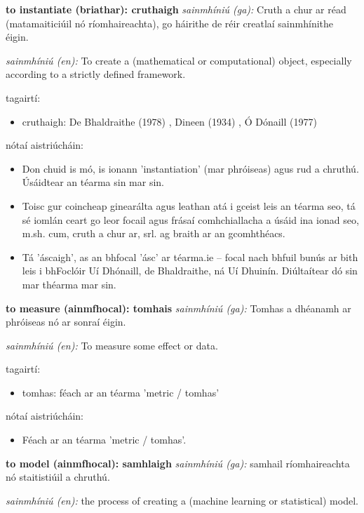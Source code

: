 \documentclass{article}
\begin{document}
\textbf{to instantiate (briathar): cruthaigh}
\textit{sainmhíniú (ga):} Cruth a chur ar réad (matamaiticiúil nó ríomhaireachta), go háirithe de réir creatlaí sainmhínithe éigin.

\textit{sainmhíniú (en):} To create a (mathematical or computational) object, especially according to a strictly defined framework.

tagairtí:
\begin{itemize}
	\item cruthaigh: De Bhaldraithe (1978) \cite{de-bhaldraithe}, Dineen (1934) \cite{dineen}, Ó Dónaill (1977) \cite{odonaill}
\end{itemize}

nótaí aistriúcháin:
\begin{itemize}
	\item Don chuid is mó, is ionann 'instantiation' (mar phróiseas) agus rud a chruthú. Úsáidtear an téarma sin mar sin.
	\item Toisc gur coincheap ginearálta agus leathan atá i gceist leis an téarma seo, tá sé iomlán ceart go leor focail agus frásaí comhchiallacha a úsáid ina ionad seo, m.sh. cum, cruth a chur ar, srl. ag braith ar an gcomhthéacs.
	\item Tá 'áscaigh', as an  bhfocal 'ásc' ar téarma.ie -- focal nach bhfuil bunús ar bith leis i bhFoclóir Uí Dhónaill, de Bhaldraithe, ná Uí Dhuinín. Diúltaítear dó sin mar théarma mar sin.
\end{itemize}


\textbf{to measure (ainmfhocal): tomhais}
\textit{sainmhíniú (ga):} Tomhas a dhéanamh ar phróiseas nó ar sonraí éigin.

\textit{sainmhíniú (en):} To measure some effect or data.

tagairtí:
\begin{itemize}
	\item tomhas: féach ar an téarma 'metric / tomhas'
\end{itemize}

nótaí aistriúcháin:
\begin{itemize}
	\item Féach ar an téarma 'metric / tomhas'.
\end{itemize}


\textbf{to model (ainmfhocal): samhlaigh}
\textit{sainmhíniú (ga):} samhail ríomhaireachta nó staitistiúil a chruthú.

\textit{sainmhíniú (en):} the process of creating a (machine learning or statistical) model.
\end{document}

